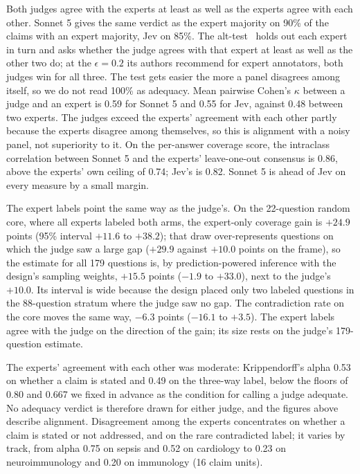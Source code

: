 \documentclass[sn-mathphys,Numbered]{sn-jnl}%
\begin{document}
Both judges agree with the experts at least as well as the experts agree with each other.
Sonnet 5 gives the same verdict as the expert majority on 90\% of the claims with an
expert majority, Jev on 85\%. The alt-test~\cite{alttest} holds out each expert in turn and asks whether the judge agrees with
that expert at least as well as the other two do; at the
$\epsilon = 0.2$ its authors recommend for expert annotators, both judges win for all three. The test gets easier the more a
panel disagrees among itself, so we do not read 100\% as adequacy. Mean pairwise Cohen's $\kappa$
between a judge and an expert is 0.59 for Sonnet 5 and 0.55 for Jev, against 0.48
between two experts. The judges exceed the experts' agreement with each other partly because
the experts disagree among themselves, so this is alignment with a noisy panel, not superiority
to it. On the per-answer coverage score, the intraclass correlation
between Sonnet 5 and the experts' leave-one-out consensus is 0.86, above the experts'
own ceiling of 0.74; Jev's is 0.82. Sonnet 5 is ahead of Jev on every measure by a
small margin.

The expert labels point the same way as the judge's. On the 22-question random core,
where all experts labeled both arms, the expert-only coverage gain is $+24.9$ points
(95\% interval $+11.6$ to $+38.2$); that draw over-represents questions on which the judge saw
a large gap ($+29.9$ against $+10.0$ points on the frame), so the estimate for all 179 questions
is, by prediction-powered
inference with the design's sampling weights, $+15.5$ points ($-1.9$ to
$+33.0$), next to the judge's $+10.0$. Its interval is wide because the design placed only
two labeled questions in the 88-question stratum where the judge saw no gap. The
contradiction rate on the core moves the same way, $-6.3$ points ($-16.1$ to $+3.5$). The
expert labels agree with the judge on the direction of the gain; its size rests on the
judge's 179-question estimate.

The experts' agreement with each other was moderate: Krippendorff's alpha 0.53 on
whether a claim is stated and 0.49 on the three-way label, below the floors of 0.80 and
0.667 we fixed in advance as the condition for calling a judge adequate. No adequacy
verdict is therefore drawn for either judge, and the figures above describe alignment. Disagreement among the experts concentrates on
whether a claim is stated or not addressed, and on the rare contradicted label; it varies
by track, from alpha 0.75 on sepsis and 0.52 on cardiology to 0.23 on neuroimmunology
and 0.20 on immunology (16 claim units).
\end{document}
